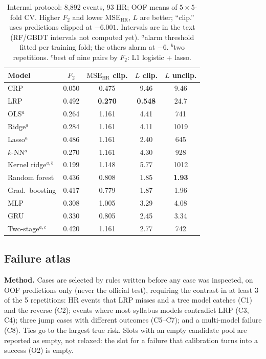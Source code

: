 \documentclass[clean,twocolumn]{bam-proposal}
\newcommand{\MSEHR}{\mathrm{MSE}_{\mathrm{HR}}}
\begin{document}
\begin{table}[t]
\centering\footnotesize
\caption{Internal protocol: 8{,}892 events, 93 HR; OOF means of $5\times5$-fold CV. Higher $F_2$ and lower $\MSEHR$, $L$ are better; ``clip.'' uses predictions clipped at $-6.001$. Intervals are in the text (RF/GBDT intervals not computed yet). $^{a}$alarm threshold fitted per training fold; the others alarm at $-6$. $^{b}$two repetitions. $^{c}$best of nine pairs by $F_2$: L1 logistic + lasso.}
\label{tab:oof}
\setlength{\tabcolsep}{3pt}
\begin{tabular}{@{}lcccc@{}}
\toprule
Model & $F_2$ & $\MSEHR$ clip. & $L$ clip. & $L$ unclip. \\
\midrule
CRP & 0.050 & 0.475 & 9.46 & 9.46 \\
LRP & 0.492 & \textbf{0.270} & \textbf{0.548} & 24.7 \\
\midrule
OLS$^{a}$ & 0.264 & 1.161 & 4.41 & 741 \\
Ridge$^{a}$ & 0.284 & 1.161 & 4.11 & 1019 \\
Lasso$^{a}$ & 0.486 & 1.161 & 2.40 & 645 \\
$k$-NN$^{a}$ & 0.270 & 1.161 & 4.30 & 928 \\
Kernel ridge$^{a,b}$ & 0.199 & 1.148 & 5.77 & 1012 \\
\midrule
Random forest & 0.436 & 0.808 & 1.85 & \textbf{1.93} \\
Grad.\ boosting & 0.417 & 0.779 & 1.87 & 1.96 \\
MLP & 0.308 & 1.005 & 3.29 & 4.08 \\
GRU & 0.330 & 0.805 & 2.45 & 3.34 \\
\midrule
Two-stage$^{a,c}$ & 0.420 & 1.161 & 2.77 & 742 \\
\bottomrule
\end{tabular}
\end{table}

\subsection{Failure atlas}\label{sec:atlas}
\textbf{Method.} Cases are selected by rules written before any case was inspected, on OOF predictions only (never the official test), requiring the contrast in at least 3 of the 5 repetitions: HR events that LRP misses and a tree model catches (C1) and the reverse (C2); events where most syllabus models contradict LRP (C3, C4); three jump cases with different outcomes (C5--C7); and a multi-model failure (C8). Ties go to the largest true risk. Slots with an empty candidate pool are reported as empty, not relaxed: the slot for a failure that calibration turns into a success (O2) is empty.
\end{document}
